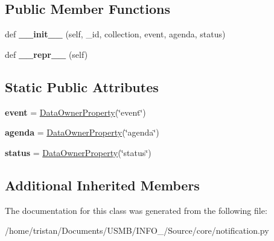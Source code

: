 \subsection*{Public Member Functions}
\begin{DoxyCompactItemize}
\item 
\mbox{\label{classSource_1_1core_1_1notification_1_1Notification_a957251915d6f26f621420f3a9eaff192}} 
def {\bfseries \+\_\+\+\_\+init\+\_\+\+\_\+} (self, \+\_\+id, collection, event, agenda, status)
\item 
\mbox{\label{classSource_1_1core_1_1notification_1_1Notification_a7ab07601c90618e04325cfdacf0cd308}} 
def {\bfseries \+\_\+\+\_\+repr\+\_\+\+\_\+} (self)
\end{DoxyCompactItemize}
\subsection*{Static Public Attributes}
\begin{DoxyCompactItemize}
\item 
\mbox{\label{classSource_1_1core_1_1notification_1_1Notification_a7ea11d6511202bc217ac991722fd3430}} 
{\bfseries event} = \mbox{\hyperlink{classSource_1_1core_1_1dataproperty_1_1DataOwnerProperty}{Data\+Owner\+Property}}(\char`\"{}event\char`\"{})
\item 
\mbox{\label{classSource_1_1core_1_1notification_1_1Notification_aff5ae8ab5c5bf7a8d539a2d39b0a831a}} 
{\bfseries agenda} = \mbox{\hyperlink{classSource_1_1core_1_1dataproperty_1_1DataOwnerProperty}{Data\+Owner\+Property}}(\char`\"{}agenda\char`\"{})
\item 
\mbox{\label{classSource_1_1core_1_1notification_1_1Notification_a3cd653af18a24b8ebdd2a54fb83aec05}} 
{\bfseries status} = \mbox{\hyperlink{classSource_1_1core_1_1dataproperty_1_1DataOwnerProperty}{Data\+Owner\+Property}}(\char`\"{}status\char`\"{})
\end{DoxyCompactItemize}
\subsection*{Additional Inherited Members}


The documentation for this class was generated from the following file\+:\begin{DoxyCompactItemize}
\item 
/home/tristan/\+Documents/\+U\+S\+M\+B/\+I\+N\+F\+O\+\_/\+Source/core/notification.\+py\end{DoxyCompactItemize}
